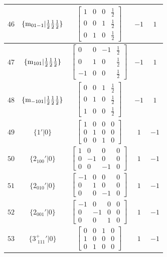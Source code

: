 \documentclass[fleqn,8pt]{jsarticle}
\begin{document}
\begin{longtable}{ccccc}
$ 46 $ & $ \{{\rm m}_{01-1}|\frac{1}{2} \frac{1}{2} \frac{1}{2}\} $ & $ \begin{bmatrix} 1 & 0 & 0 & \frac{1}{2} \\ 0 & 0 & 1 & \frac{1}{2} \\ 0 & 1 & 0 & \frac{1}{2} \end{bmatrix} $ & $ -1 $ & $ 1 $ \\ \hline
$ 47 $ & $ \{{\rm m}_{101}|\frac{1}{2} \frac{1}{2} \frac{1}{2}\} $ & $ \begin{bmatrix} 0 & 0 & -1 & \frac{1}{2} \\ 0 & 1 & 0 & \frac{1}{2} \\ -1 & 0 & 0 & \frac{1}{2} \end{bmatrix} $ & $ -1 $ & $ 1 $ \\ \hline
$ 48 $ & $ \{{\rm m}_{-101}|\frac{1}{2} \frac{1}{2} \frac{1}{2}\} $ & $ \begin{bmatrix} 0 & 0 & 1 & \frac{1}{2} \\ 0 & 1 & 0 & \frac{1}{2} \\ 1 & 0 & 0 & \frac{1}{2} \end{bmatrix} $ & $ -1 $ & $ 1 $ \\ \hline
$ 49 $ & $ \{1{}'|0\} $ & $ \begin{bmatrix} 1 & 0 & 0 & 0 \\ 0 & 1 & 0 & 0 \\ 0 & 0 & 1 & 0 \end{bmatrix} $ & $ 1 $ & $ -1 $ \\ \hline
$ 50 $ & $ \{2{}_{100}{}'|0\} $ & $ \begin{bmatrix} 1 & 0 & 0 & 0 \\ 0 & -1 & 0 & 0 \\ 0 & 0 & -1 & 0 \end{bmatrix} $ & $ 1 $ & $ -1 $ \\ \hline
$ 51 $ & $ \{2{}_{010}{}'|0\} $ & $ \begin{bmatrix} -1 & 0 & 0 & 0 \\ 0 & 1 & 0 & 0 \\ 0 & 0 & -1 & 0 \end{bmatrix} $ & $ 1 $ & $ -1 $ \\ \hline
$ 52 $ & $ \{2{}_{001}{}'|0\} $ & $ \begin{bmatrix} -1 & 0 & 0 & 0 \\ 0 & -1 & 0 & 0 \\ 0 & 0 & 1 & 0 \end{bmatrix} $ & $ 1 $ & $ -1 $ \\ \hline
$ 53 $ & $ \{3^{+}_{\,\,111}{}'|0\} $ & $ \begin{bmatrix} 0 & 0 & 1 & 0 \\ 1 & 0 & 0 & 0 \\ 0 & 1 & 0 & 0 \end{bmatrix} $ & $ 1 $ & $ -1 $ \\ \hline

\end{longtable}
\end{document}
